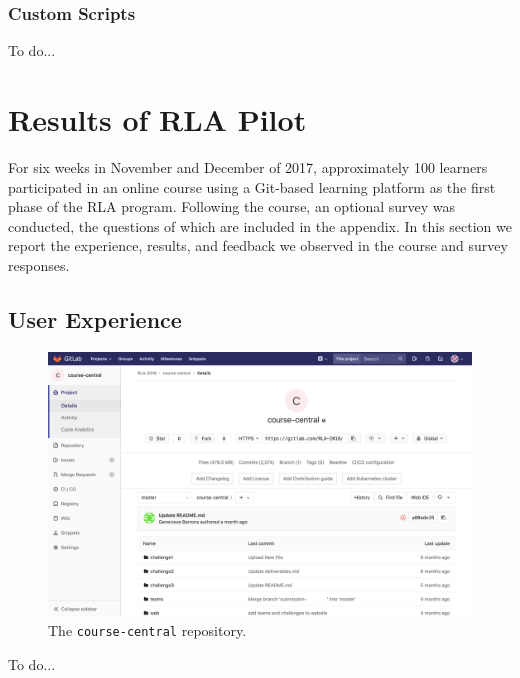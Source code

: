 \documentclass[12pt,twoside,vi]{mitthesis}
\newcommand{\wip}[1]{{\color{red} To do...}}
\begin{document}
\subsection{Custom Scripts}

\wip{As much as possible, Git-related operations of the platform were automated to ease the burden on the instructors. 
Onboarding membership request poller
Onboarding group creation
Health check with email notifications
Create subtrees
Create merge request
Merge
Analyze progress}


\chapter{Results of RLA Pilot}

For six weeks in November and December of 2017, approximately 100 learners participated in an online course using a Git-based learning platform as the first phase of the RLA program. Following the course, an optional survey was conducted, the questions of which are included in the appendix. In this section we report the experience, results, and feedback we observed in the course and survey responses.

\section{User Experience}

\begin{figure}[H]
\centering
\includegraphics[scale=0.3]{fig-course-central.png}
\caption{The \texttt{course-central} repository.}
\end{figure}

\wip{Frame around tensions, for each broad set of interactions go over "what did it look like", "how did it work", and "how well did it work"}
\end{document}
